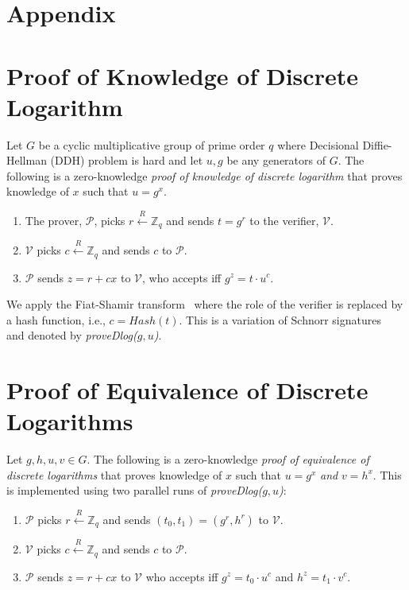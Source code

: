 \documentclass[runningheads]{llncs}
\begin{document}
\section*{Appendix}

\section{Proof of Knowledge of Discrete Logarithm}
\label{provedlog}

Let $G$ be a cyclic multiplicative group of prime order $q$ where Decisional Diffie-Hellman (DDH) problem is hard and let $u, g$ be any generators of $G$.
The following is a zero-knowledge {\em proof of knowledge of discrete logarithm} that proves knowledge of $x$ such that $u = g^x$.
\begin{enumerate}
\item The prover, $\mathcal{P}$, picks $r \stackrel{R}{\leftarrow} \mathbb{Z}_q$ and sends $t = g^r$ to the verifier, $\mathcal{V}$.
\item $\mathcal{V}$ picks $c \stackrel{R}{\leftarrow} \mathbb{Z}_q$ and sends $c$ to $\mathcal{P}$.
\item $\mathcal{P}$ sends $z = r + cx$ to $\mathcal{V}$, who accepts iff ${g}^z = t\cdot {u}^c$.
\end{enumerate}

We apply the Fiat-Shamir transform~\cite{fiatshamir} where the role of the verifier is replaced by a hash function, i.e., $c = Hash(t)$.
This is a variation of Schnorr signatures~\cite{Sch91} and denoted by \emph{proveDlog($g, u$)}.

\section{Proof of Equivalence of Discrete Logarithms}
\label{provedhtuple}
Let $g, h, u, v \in G$. The following is a zero-knowledge {\em proof of equivalence of discrete logarithms} that proves knowledge of $x$ such that $u = g^x$ {\em and} $v = h^x$. This is implemented using two parallel runs of \emph{proveDlog($g, u$)}:

\begin{enumerate}
\item $\mathcal{P}$ picks $r \stackrel{R}{\leftarrow} \mathbb{Z}_q$ and sends $(t_0, t_1) = ({g}^r, {h}^r)$ to $\mathcal{V}$.
\item $\mathcal{V}$ picks $c \stackrel{R}{\leftarrow} \mathbb{Z}_q$ and sends $c$ to $\mathcal{P}$.
\item $\mathcal{P}$ sends $z = r + cx$ to $\mathcal{V}$ who accepts iff ${g}^z = {t_0}\cdot {u}^c$ and $h^z=t_1\cdot v^c$.
\end{enumerate}
\end{document}
